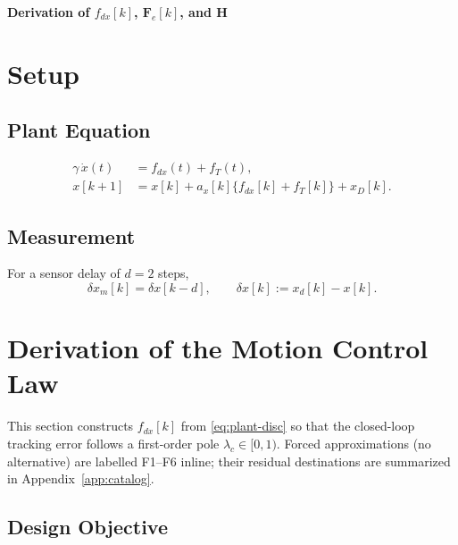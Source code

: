 \documentclass[11pt,a4paper]{ctexart}
\newcommand{\lc}{\lambda_c}
\newcommand{\fdx}{f_{dx}}
\newcommand{\fT}{f_T}
\newcommand{\dx}{\delta x}
\newcommand{\dxm}{\delta x_m}
\newcommand{\xD}{x_D}
\newcommand{\ax}{a_x}
\newcommand{\Fe}{\mathbf{F}_e}
\newcommand{\HH}{\mathbf{H}}
\begin{document}
\thispagestyle{empty}

\begin{center}
{\Large\bfseries Derivation of $\fdx[k]$, $\Fe[k]$, and $\HH$}
\end{center}
\vspace{0.3cm}

\section{Setup}

\subsection{Plant Equation}

\begin{align}
\gamma\,\dot x(t) &= \fdx(t) + \fT(t), \label{eq:plant-cont} \\
x[k{+}1] &= x[k] + \ax[k]\bigl\{\fdx[k]+\fT[k]\bigr\} + \xD[k]. \label{eq:plant-disc}
\end{align}

\subsection{Measurement}

For a sensor delay of $d=2$ steps,
\begin{equation}
\dxm[k] = \dx[k{-}d], \qquad \dx[k] := x_d[k] - x[k].
\label{eq:meas-dxm}
\end{equation}

\section{Derivation of the Motion Control Law}
\label{sec:ctrl-deriv}

This section constructs $\fdx[k]$ from \eqref{eq:plant-disc} so that the closed-loop tracking error follows a first-order pole $\lc \in [0,1)$. Forced approximations (no alternative) are labelled F1--F6 inline; their residual destinations are summarized in Appendix~\ref{app:catalog}.

\subsection{Design Objective}
\end{document}
